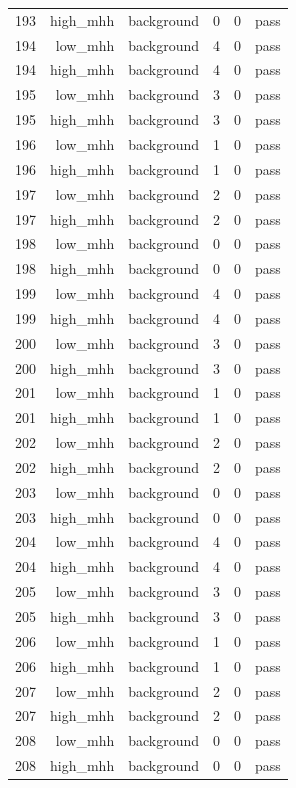 \begin{table}[htbp]
{\begin{tabular}{lrrrrr}
193 & high\_mhh & background & 0 & 0 & pass \\
194 & low\_mhh & background & 4 & 0 & pass \\
194 & high\_mhh & background & 4 & 0 & pass \\
195 & low\_mhh & background & 3 & 0 & pass \\
195 & high\_mhh & background & 3 & 0 & pass \\
196 & low\_mhh & background & 1 & 0 & pass \\
196 & high\_mhh & background & 1 & 0 & pass \\
197 & low\_mhh & background & 2 & 0 & pass \\
197 & high\_mhh & background & 2 & 0 & pass \\
198 & low\_mhh & background & 0 & 0 & pass \\
198 & high\_mhh & background & 0 & 0 & pass \\
199 & low\_mhh & background & 4 & 0 & pass \\
199 & high\_mhh & background & 4 & 0 & pass \\
200 & low\_mhh & background & 3 & 0 & pass \\
200 & high\_mhh & background & 3 & 0 & pass \\
201 & low\_mhh & background & 1 & 0 & pass \\
201 & high\_mhh & background & 1 & 0 & pass \\
202 & low\_mhh & background & 2 & 0 & pass \\
202 & high\_mhh & background & 2 & 0 & pass \\
203 & low\_mhh & background & 0 & 0 & pass \\
203 & high\_mhh & background & 0 & 0 & pass \\
204 & low\_mhh & background & 4 & 0 & pass \\
204 & high\_mhh & background & 4 & 0 & pass \\
205 & low\_mhh & background & 3 & 0 & pass \\
205 & high\_mhh & background & 3 & 0 & pass \\
206 & low\_mhh & background & 1 & 0 & pass \\
206 & high\_mhh & background & 1 & 0 & pass \\
207 & low\_mhh & background & 2 & 0 & pass \\
207 & high\_mhh & background & 2 & 0 & pass \\
208 & low\_mhh & background & 0 & 0 & pass \\
208 & high\_mhh & background & 0 & 0 & pass \\

\end{tabular}}
\end{table}
